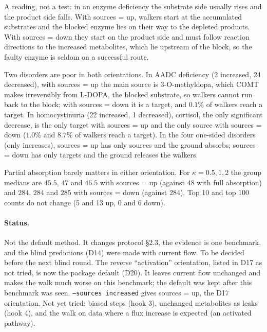 \documentclass[11pt]{article}
\newcommand{\code}[1]{\texttt{#1}}
\begin{document}
A reading, not a test: in an enzyme deficiency the substrate side usually rises and the
product side falls. With sources = up, walkers start at the accumulated substrates and
the blocked enzyme lies on their way to the depleted products. With sources = down they
start on the product side and must follow reaction directions to the increased
metabolites, which lie upstream of the block, so the faulty enzyme is seldom on a
successful route.

Two disorders are poor in both orientations. In AADC deficiency (2 increased, 24
decreased), with sources = up the main source is 3-O-methyldopa, which COMT makes
irreversibly from L-DOPA, the blocked substrate, so walkers cannot run back to the
block; with sources = down it is a target, and $0.1\%$ of walkers reach a target. In
homocystinuria (22 increased, 1 decreased), cortisol, the only significant decrease, is
the only target with sources = up and the only source with sources = down ($1.0\%$ and
$8.7\%$ of walkers reach a target). In the four one-sided disorders (only increases),
sources = up has only sources and the ground absorbs; sources = down has only targets
and the ground releases the walkers.

Partial absorption barely matters in either orientation. For $\kappa=0.5,1,2$ the
group medians are $45.5$, $47$ and $46.5$ with sources = up (against $48$ with full
absorption) and $284$, $284$ and $285$ with sources = down (against $284$). Top 10 and
top 100 counts do not change (5 and 13 up, 0 and 6 down).

\paragraph{Status.} Not the default method. It changes protocol \S2.3, the evidence is
one benchmark, and the blind predictions (D14) were made with current flow. To be
decided before the next blind round. The reverse ``activation'' orientation, listed in
D17 as not tried, is now the package default (D20). It leaves current flow unchanged
and makes the walk much worse on this benchmark; the default was kept after this
benchmark was seen. \code{--sources increased} gives sources = up, the D17 orientation. Not yet
tried: biased steps (hook 3), unchanged metabolites as leaks (hook 4), and the walk on
data where a flux increase is expected (an activated pathway).

\end{document}
